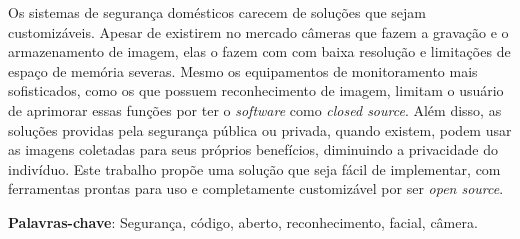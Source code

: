 \documentclass[12pt, %
openright, 
oneside, %
a4paper,    %
brazil]{facom-ufu-abntex2}
\begin{document}



\begin{resumo} %
	Os sistemas de segurança domésticos carecem de soluções
	que sejam customizáveis. Apesar de existirem no mercado câmeras que fazem a gravação e o armazenamento de
	imagem, elas o fazem com com baixa resolução e limitações de espaço de memória severas. Mesmo os equipamentos
	de monitoramento mais sofisticados, como os que possuem reconhecimento de imagem, limitam o usuário de aprimorar
	essas funções por ter o \textit{\foreignlanguage{english}{software}} como \textit{\foreignlanguage{english}{closed source}}.
	Além disso, as soluções providas pela segurança pública ou privada, quando existem, podem usar as imagens
	coletadas para seus próprios benefícios, diminuindo a privacidade do indivíduo. Este trabalho propõe uma solução que seja
	fácil de implementar, com ferramentas prontas para uso e completamente customizável por ser \textit{\foreignlanguage{english}{open source}}.

	\vspace{\onelineskip}

	\noindent
	\textbf{Palavras-chave}: Segurança, código,  aberto, reconhecimento, facial, câmera.  %
\end{resumo}

\listoffigures*
\cleardoublepage

\listoftables*
\cleardoublepage
\end{document}
